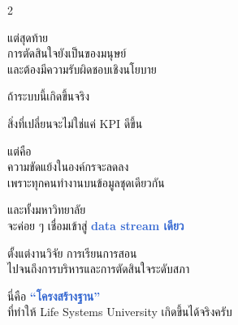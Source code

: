 \documentclass[10pt]{article}
\begin{document}
\begin{tcolorbox}[breakable,colback=panel,colframe=line,boxrule=0.5pt,arc=2mm,left=3mm,right=3mm,top=2mm,bottom=2mm]
\begin{multicols}{2}
\par แต่สุดท้าย\\ การตัดสินใจยังเป็นของมนุษย์\\ และต้องมีความรับผิดชอบเชิงนโยบาย
\par ถ้าระบบนี้เกิดขึ้นจริง
\par สิ่งที่เปลี่ยนจะไม่ใช่แค่ KPI ดีขึ้น
\par แต่คือ\\ ความขัดแย้งในองค์กรจะลดลง\\ เพราะทุกคนทำงานบนข้อมูลชุดเดียวกัน
\par และทั้งมหาวิทยาลัย\\ จะค่อย ๆ เชื่อมเข้าสู่ \textbf{\textcolor{highlight}{data stream เดียว}}
\par ตั้งแต่งานวิจัย การเรียนการสอน\\ ไปจนถึงการบริหารและการตัดสินใจระดับสภา
\par นี่คือ \textbf{\textcolor{highlight}{“โครงสร้างฐาน”}}\\ ที่ทำให้ Life Systems University เกิดขึ้นได้จริงครับ
\end{multicols}
\end{tcolorbox}

\clearpage
\end{document}
